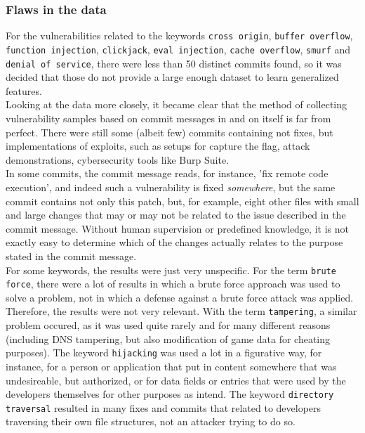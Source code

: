 \documentclass[
a4paper,
pagesize,
pdftex,
12pt,
twoside, %
BCOR=5mm, %
ngerman,
fleqn,
final,
]{scrartcl}
\begin{document}
	\subsubsection{Flaws in the data}\label{data-problems}
	
	For the vulnerabilities related to the keywords \texttt{cross origin}, \texttt{buffer overflow}, \texttt{function injection}, \texttt{clickjack}, \texttt{eval injection}, \texttt{cache overflow}, \texttt{smurf} and \texttt{denial of service}, there were less than 50 distinct commits found, so it was decided that those do not provide a large enough dataset to learn generalized features. \\
	Looking at the data more closely, it became clear that the method of collecting vulnerability samples based on commit messages in and on itself is far from perfect. There were still some (albeit few) commits containing not fixes, but implementations of exploits, such as setups for capture the flag, attack demonstrations, cybersecurity tools like Burp Suite.\\
	In some commits, the commit message reads, for instance, 'fix remote code execution', and indeed such a vulnerability is fixed \textit{somewhere}, but the same commit contains not only this patch, but, for example, eight other files with small and large changes that may or may not be related to the issue described in the commit message. Without human supervision or predefined knowledge, it is not exactly easy to determine which of the changes actually relates to the purpose stated in the commit message.\\
	For some keywords, the results were just very unspecific. For the term \texttt{brute force}, there were a lot of results in which a brute force approach was used to solve a problem, not in which a defense against a brute force attack was applied. Therefore, the results were not very relevant. With the term \texttt{tampering}, a similar problem occured, as it was used quite rarely and for many different reasons (including DNS tampering, but also modification of game data for cheating purposes). The keyword \texttt{hijacking} was used a lot in a figurative way, for instance, for a person or application that put in content somewhere that was undesireable, but authorized, or for data fields or entries that were used by the developers themselves for other purposes as intend. The keyword \texttt{directory traversal} resulted in many fixes and commits that related to developers traversing their own file structures, not an attacker trying to do so.\\
\end{document}
